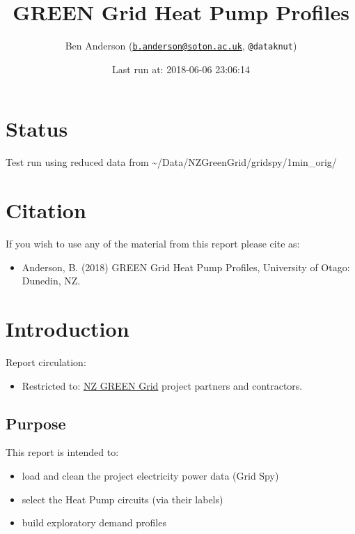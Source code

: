 \documentclass[]{article}
\title{GREEN Grid Heat Pump Profiles}
\author{Ben Anderson
(\href{mailto:b.anderson@soton.ac.uk}{\nolinkurl{b.anderson@soton.ac.uk}},
\texttt{@dataknut})}
\date{Last run at: 2018-06-06 23:06:14}
\providecommand{\tightlist}{%
  \setlength{\itemsep}{0pt}\setlength{\parskip}{0pt}}
\begin{document}
\maketitle

{
\setcounter{tocdepth}{2}
\tableofcontents
}
\newpage

\section{Status}\label{status}

Test run using reduced data from
\textasciitilde{}/Data/NZGreenGrid/gridspy/1min\_orig/

\section{Citation}\label{citation}

If you wish to use any of the material from this report please cite as:

\begin{itemize}
\tightlist
\item
  Anderson, B. (2018) GREEN Grid Heat Pump Profiles, University of
  Otago: Dunedin, NZ.
\end{itemize}

\newpage

\section{Introduction}\label{introduction}

Report circulation:

\begin{itemize}
\tightlist
\item
  Restricted to:
  \href{https://www.otago.ac.nz/centre-sustainability/research/energy/otago050285.html}{NZ
  GREEN Grid} project partners and contractors.
\end{itemize}

\subsection{Purpose}\label{purpose}

This report is intended to:

\begin{itemize}
\tightlist
\item
  load and clean the project electricity power data (Grid Spy)
\item
  select the Heat Pump circuits (via their labels)
\item
  build exploratory demand profiles
\end{itemize}
\end{document}
